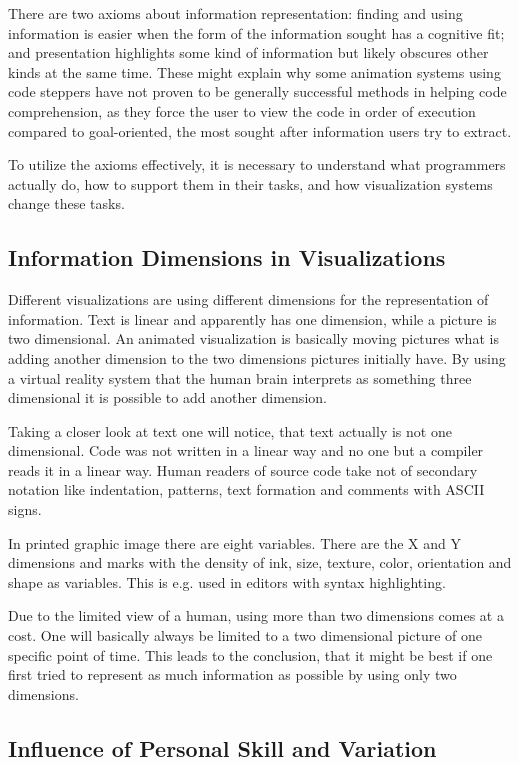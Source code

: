 \documentclass[11pt, a4paper, ngerman, twoside]{article}
\theoremstyle{plain}\newtheorem{Lemma}{Lemma}
\theoremstyle{plain}\newtheorem{Satz}[Lemma]{Satz}
\theoremstyle{definition}\newtheorem{Definition}[Lemma]{Definition}
\theoremstyle{definition}\newtheorem*{Beispiel}{Beispiel}
\theoremstyle{remark}\newtheorem*{Bemerkung}{Bemerkung}
\begin{document}
There are two axioms about information representation: finding and using information is easier when the form of the information sought has a cognitive fit; and presentation highlights some kind of information but likely obscures other kinds at the same time. These might explain why some animation systems using code steppers have not proven to be generally successful methods in helping code comprehension, as they force the user to view the code in order of execution compared to goal-oriented, the most sought after information users try to extract.

To utilize the axioms effectively, it is necessary to understand what programmers actually do, how to support them in their tasks, and how visualization systems change these tasks.

\subsection{Information Dimensions in Visualizations}

Different visualizations are using different dimensions for the representation of information. Text is linear and apparently has one dimension, while a picture is two dimensional. An animated visualization is basically moving pictures what is adding another dimension to the two dimensions pictures initially have. By using a virtual reality system that the human brain interprets as something three dimensional it is possible to add another dimension.

Taking a closer look at text one will notice, that text actually is not one dimensional. Code was not written in a linear way and no one but a compiler reads it in a linear way. Human readers of source code take not of secondary notation \cite{green} like indentation, patterns, text formation and comments with ASCII signs.

In printed graphic image there are eight variables\cite{bertin}. There are the X and Y dimensions and marks with the density of ink, size, texture, color, orientation and shape as variables. This is e.g. used in editors with syntax highlighting.

Due to the limited view of a human, using more than two dimensions comes at a cost. One will basically always be limited to a two dimensional picture of one specific point of time. This leads to the conclusion, that it might be best if one first tried to represent as much information as possible by using only two dimensions.

\subsection{Influence of Personal Skill and Variation}
\end{document}
